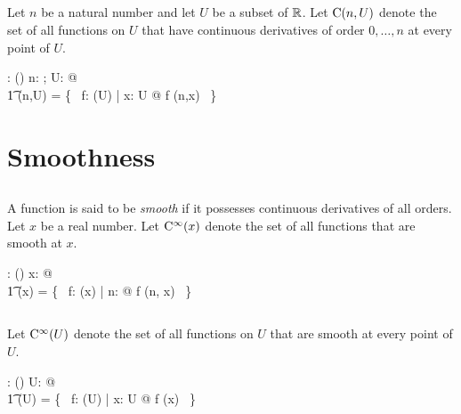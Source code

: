 \documentclass[11pt, oneside]{article}
\begin{document}
\subsection{}

Let $n$ be a natural number and let $U$ be a subset of $\mathbb{R}$.
Let $\operatorname{C}(n,U)$ denote the set of all functions on $U$ that have continuous derivatives of order $0, \ldots, n$
at every point of $U$.

\begin{axdef}
	\CnPR: \nat \cross \power \R \fun \power(\R \pfun \R)
\where
	\forall n: \nat; U: \power \R @ \\
	\t1	\CnPR(n,U) = \{~ f: \FunPR(U) | \forall x: U @ f \in \CnR(n,x) ~\}
\end{axdef}

\section{Smoothness}

\subsection{}

A function is said to be {\it smooth} if it possesses continuous derivatives of all orders.
Let $x$ be a real number.
Let $\operatorname{C^{\infty}}(x)$ denote the set of all functions that are smooth at $x$.

\begin{axdef}
	\smoothR: \R \fun \power(\R \pfun \R)
\where
	\forall x: \R @ \\
	\t1	\smoothR(x) = \{~ f: \FunR(x) | \forall n: \nat @ f \in \CnR(n, x) ~\}
\end{axdef}

\subsection{}

Let $\operatorname{C^{\infty}}(U)$ denote the set of all functions on $U$ that are smooth at every point of $U$.

\begin{axdef}
	\smoothPR: \power \R \fun \power (\R \pfun \R)
\where
	\forall U: \power \R @ \\
	\t1	\smoothPR(U) = \{~ f: \FunPR(U) | \forall x: U @ f \in \smoothR(x) ~\}
\end{axdef}

\printbibliography
\end{document}
